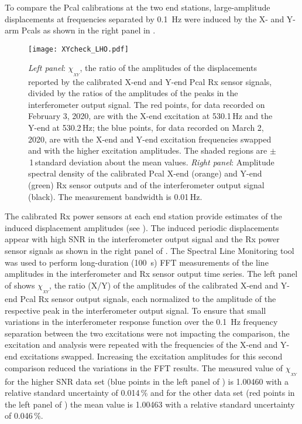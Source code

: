 \documentclass[12pt,a4paper,final]{iopart}
\begin{document}
To compare the Pcal calibrations at the two end stations, large-amplitude displacements at frequencies separated by 0.1~Hz were induced by the X- and Y-arm Pcals as shown in the right panel in .
%
\begin{figure}[t]%
    \begin{center}
    \texttt{[image: XYcheck\_LHO.pdf]}
    \caption{{\em Left panel}: $\chi_{_{XY}}$, the ratio of the amplitudes of the displacements reported by the calibrated X-end and Y-end Pcal Rx sensor signals, divided by the ratios of the amplitudes of the peaks in the interferometer output signal. The red points, for data recorded on February 3, 2020, are with the X-end excitation at 530.1\,Hz and the Y-end  at 530.2\,Hz; the blue points, for data recorded on March 2, 2020, are with the X-end and Y-end excitation frequencies swapped and with the higher excitation amplitudes. The shaded regions are $\pm$\,1\,standard deviation about the mean values. {\em Right panel}: Amplitude spectral density of the calibrated Pcal X-end (orange) and Y-end (green) Rx sensor outputs and of the interferometer output signal (black).  The measurement bandwidth is 0.01\,Hz. }
    \label{fig:X_vs_Y}
    \end{center}
\end{figure}
%
The calibrated Rx power sensors at each end station provide estimates of the induced displacement amplitudes (see ).  The induced periodic displacements appear with high SNR in the interferometer output signal and the Rx power sensor signals as shown in the right panel of .  The Spectral Line Monitoring tool\,\cite{SLMTool} was used to perform long-duration (100~s) FFT measurements of the line amplitudes in the interferometer and Rx sensor output time series.   
The left panel of  shows $\chi_{_{XY}}$, the ratio (X/Y) of the  amplitudes of the calibrated X-end and Y-end Pcal Rx sensor output signals, each normalized to the amplitude of the respective peak in the interferometer output signal. 
To ensure that small variations in the interferometer response function over the 0.1~Hz frequency separation between the two excitations were not impacting the comparison, the excitation and analysis were repeated with the frequencies of the X-end and Y-end excitations swapped.  Increasing the excitation amplitudes for this second comparison reduced the variations in the FFT results.  The measured value of $\chi_{_{XY}}$ for the higher SNR data set (blue points in the left panel of ) is 1.00460 with a relative standard uncertainty of 0.014\,\% and for the other data set (red points in the left panel of ) the mean value is 1.00463 with a relative standard uncertainty of 0.046\,\%.
 
\end{document}
